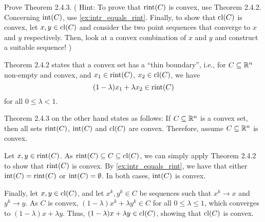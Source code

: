 \begin{exercise}
  Prove Theorem 2.4.3.
  (%
    Hint: To prove that $\operatorname*{rint}(C)$ is convex, use Theorem 2.4.2.
    Concerning $\operatorname*{int}(C)$, use \cref{ex:intr_equals_rint}.
    Finally, to show that $\operatorname*{cl}(C)$ is convex, let $x, y \in \operatorname*{cl}(C)$ and consider the two point sequences that converge to $x$ and $y$ respectively.
    Then, look at a convex combination of $x$ and $y$ and construct a suitable sequence!%
  )
\end{exercise}

\begin{solution}
  Theorem 2.4.2 states that a convex set has a ``thin boundary'', i.e., for $C \subseteq \mathbb{R}^n$ non-empty and convex, and $x_1 \in \operatorname*{rint}(C)$, $x_2 \in \operatorname*{cl}(C)$, we have
  \begin{equation}
    (1 - \lambda) x_1 + \lambda x_2 \in \operatorname*{rint}(C)
  \end{equation}
  for all $0 \leq \lambda < 1$.

  Theorem 2.4.3 on the other hand states as follows:
  If $C \subseteq \mathbb{R}^n$ is a convex set, then all sets $\operatorname*{rint}(C)$, $\operatorname*{int}(C)$ and $\operatorname*{cl}(C)$ are convex.
  Therefore, assume $C \subseteq \mathbb{R}^n$ is convex.

  Let $x, y \in \operatorname*{rint}(C)$.
  As $\operatorname*{rint}(C) \subseteq C \subseteq \operatorname*{cl}(C)$, we can simply apply Theorem 2.4.2 to show that $\operatorname*{rint}(C)$ is convex.
  By \cref{ex:intr_equals_rint}, we have that either $\operatorname*{int}(C) = \operatorname*{rint}(C)$ or $\operatorname*{int}(C) = \emptyset$.
  In both cases, $\operatorname*{int}(C)$ is convex.

  Finally, let $x, y \in \operatorname*{cl}(C)$,
  and let $x^k, y^k \in C$ be sequences such that $x^k \to x$ and $y^k \to y$.
  As $C$ is convex, $(1 - \lambda) x^k + \lambda y^k \in C$ for all $0 \leq \lambda \leq 1$, which converges to $(1 - \lambda) x + \lambda y$.
  Thus, $(1 - \lambda) x + \lambda y \in \operatorname*{cl}(C)$, showing that $\operatorname*{cl}(C)$ is convex.
\end{solution}